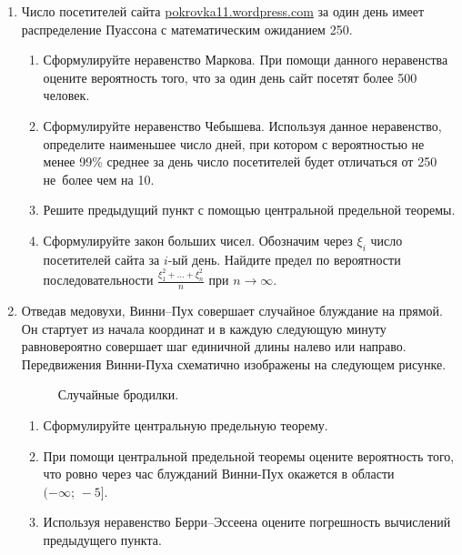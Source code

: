 \begin{enumerate}
\item Число посетителей сайта \url{pokrovka11.wordpress.com} за один день имеет распределение Пуассона с математическим ожиданием 250.
\begin{enumerate}
  \item Сформулируйте неравенство Маркова. При помощи данного неравенства оцените вероятность того, что за один день сайт посетят более 500 человек.
  \item Сформулируйте неравенство Чебышева. Используя данное неравенство, определите наименьшее число дней, при котором с вероятностью не менее 99\% среднее за день число посетителей будет отличаться от 250 не~более чем на 10.
  \item Решите предыдущий пункт с помощью центральной предельной теоремы.
  \item Сформулируйте закон больших чисел. Обозначим через $\xi_i$ число посетителей сайта за $i$-ый день. Найдите предел по вероятности последовательности $\frac{\xi_1^2 + \ldots + \xi_n^2}{n}$ при $n \rightarrow \infty$.
\end{enumerate}

\item Отведав медовухи, Винни–Пух совершает случайное блуждание на прямой. Он стартует из начала координат и в каждую следующую минуту равновероятно совершает шаг единичной длины налево или направо. Передвижения Винни-Пуха схематично изображены на следующем рисунке.
\begin{figure}[h]
    \noindent{}
    \caption{Случайные бродилки.}
    \label{wun762hkej}
\end{figure}
\begin{enumerate}
  \item Сформулируйте центральную предельную теорему.
  \item При помощи центральной предельной теоремы оцените вероятность того, что ровно через час блужданий Винни-Пух окажется в области $(-\infty; \, -5]$.
  \item Используя неравенство Берри–Эссеена оцените погрешность вычислений предыдущего пункта.
\end{enumerate}



\end{enumerate}

